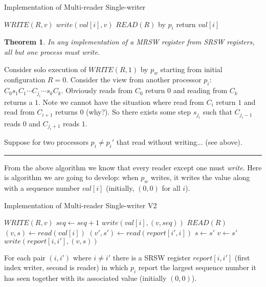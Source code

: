 \documentclass[twoside]{article}
\newcounter{lecnum}
\newtheorem{theorem}{Theorem}[lecnum]
\newenvironment{proof}{{\bf Proof:}}{\hfill\rule{2mm}{2mm}}
\begin{document}
\begin{algorithm}
	\caption{Implementation of Multi-reader Single-writer}
    \label{pseudocode:multireader}
    \begin{algorithmic}[1]
	\State $WRITE(R, v)$
		\State $write(val[i], v)$
	\EndFor
	\State
	\State $READ(R)$ by $p_i$
	\State return $val[i]$
	\end{algorithmic}
\end{algorithm}

\begin{theorem}
In any implementation of a MRSW register from SRSW registers, all but one process must write.
\end{theorem}
\begin{proof}
Consider solo execution of $WRITE(R, 1)$ by $p_w$ starting from initial configuration $R = 0$. Consider the view from another processor $p_i$: $C_0 s_1C_1 \cdots C_{j_i} \cdots s_k C_k$. Obviously reads from $C_0$ return $0$ and reading from $C_k$ returns a $1$. Note we cannot have the situation where read from $C_{i}$ return $1$ and read from $C_{i+1}$ returns $0$ (why?). So there exists some step $s_{j_i}$ such that $C_{j_i -1}$ reads $0$ and $C_{j_i+1}$ reads $1$. 

Suppose for two processors $p_i \neq p_i'$ that read without writing... (see above). 
\end{proof}

From the above algorithm we know that every reader except one must \emph{write}. Here is algorithm we are going to develop: when $p_w$ writes, it writes the value along with a sequence number $val[i]$ (initially, $(0,0)$ for all $i$).

\begin{algorithm}
	\caption{Implementation of Multi-reader Single-writer V2}
    \label{pseudocode:multireaderv2}
    \begin{algorithmic}[1]
	\State $WRITE(R, v)$
	\State $seq \leftarrow seq + 1$
		\State $write(val[i], (v, seq))$
	\EndFor
	\State
	\State $READ(R)$
	\State $(v, s) \leftarrow read(val[i])$
		\State $(v', s') \leftarrow read(report[i', i])$
			\State $s\leftarrow s'$
			\State $v\leftarrow s'$
		\EndIf
	\EndFor
		\State $write(report[i,i'], (v, s))$	
	\EndFor
	\end{algorithmic}
\end{algorithm}

For each pair $(i, i')$ where $i \neq i'$ there is a SRSW register $report[i, i']$ (first index writer, second is reader) in which $p_i$ report the largest sequence number it has seen together with its associated value (initially $(0,0)$).
\end{document}
